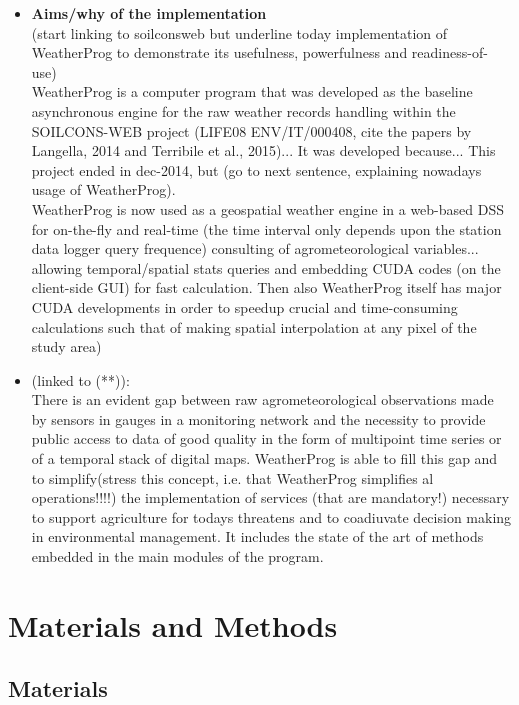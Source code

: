 \documentclass[authoryear,preprint,review,12pt]{elsarticle}
\begin{document}
\begin{itemize}
	\item\textbf{Aims/why of the implementation}\\
(start linking to soilconsweb but underline today implementation of WeatherProg to demonstrate its usefulness, powerfulness and readiness-of-use)\\
WeatherProg is a computer program that was developed as the baseline asynchronous engine for the raw weather records handling within the SOILCONS-WEB project (LIFE08 ENV/IT/000408, cite the papers by Langella, 2014 and Terribile et al., 2015)... 
It was developed because... 
This project ended in dec-2014, but (go to next sentence, explaining nowadays usage of WeatherProg).\\
WeatherProg is now used as a geospatial weather engine in a web-based DSS for on-the-fly and real-time (the time interval only depends upon the station data logger query frequence) consulting of agrometeorological variables... allowing temporal/spatial stats queries and embedding CUDA codes (on the client-side GUI) for fast calculation. Then also WeatherProg itself has major CUDA developments in order to speedup crucial and time-consuming calculations such that of making spatial interpolation at any pixel of the study area)\\

	\item(linked to (**)):\\
There is an evident gap between raw agrometeorological observations made by sensors in gauges in a monitoring network and the necessity to provide public access to data of good quality in the form of multipoint time series or of a temporal stack of digital maps.
WeatherProg is able to fill this gap and to simplify(stress this concept, i.e. that WeatherProg simplifies al operations!!!!) the implementation of services (that are mandatory!) necessary to support agriculture for todays threatens and to coadiuvate decision making in environmental management. It includes the state of the art of methods embedded in the main modules of the program.
\end{itemize}


\section{Materials and Methods}

\subsection{Materials}
\end{document}
